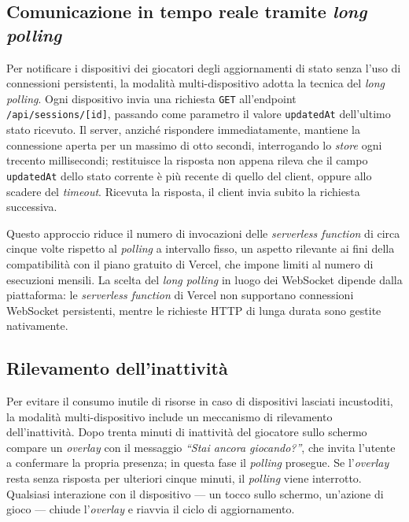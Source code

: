 \documentclass[12pt]{report}
\begin{document}
\subsection{Comunicazione in tempo reale tramite \textit{long polling}}

Per notificare i dispositivi dei giocatori degli aggiornamenti di stato senza l'uso di connessioni persistenti, la modalità multi-dispositivo adotta la tecnica del \textit{long polling}. Ogni dispositivo invia una richiesta \texttt{GET} all'endpoint \texttt{/api/sessions/[id]}, passando come parametro il valore \texttt{updatedAt} dell'ultimo stato ricevuto. Il server, anziché rispondere immediatamente, mantiene la connessione aperta per un massimo di otto secondi, interrogando lo \textit{store} ogni trecento millisecondi; restituisce la risposta non appena rileva che il campo \texttt{updatedAt} dello stato corrente è più recente di quello del client, oppure allo scadere del \textit{timeout}. Ricevuta la risposta, il client invia subito la richiesta successiva.

Questo approccio riduce il numero di invocazioni delle \textit{serverless function} di circa cinque volte rispetto al \textit{polling} a intervallo fisso, un aspetto rilevante ai fini della compatibilità con il piano gratuito di Vercel, che impone limiti al numero di esecuzioni mensili. La scelta del \textit{long polling} in luogo dei WebSocket dipende dalla piattaforma: le \textit{serverless function} di Vercel non supportano connessioni WebSocket persistenti, mentre le richieste HTTP di lunga durata sono gestite nativamente.

\subsection{Rilevamento dell'inattività}

Per evitare il consumo inutile di risorse in caso di dispositivi lasciati incustoditi, la modalità multi-dispositivo include un meccanismo di rilevamento dell'inattività. Dopo trenta minuti di inattività del giocatore sullo schermo compare un \textit{overlay} con il messaggio \textit{``Stai ancora giocando?''}, che invita l'utente a confermare la propria presenza; in questa fase il \textit{polling} prosegue. Se l'\textit{overlay} resta senza risposta per ulteriori cinque minuti, il \textit{polling} viene interrotto. Qualsiasi interazione con il dispositivo --- un tocco sullo schermo, un'azione di gioco --- chiude l'\textit{overlay} e riavvia il ciclo di aggiornamento.
\end{document}
